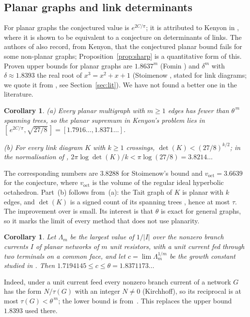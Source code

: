 \documentclass[11pt]{amsart}
\theoremstyle{plain}
\newtheorem{corollary}[theorem]{Corollary}
\theoremstyle{remark}
\newcommand{\tht}{\theta}
\begin{document}
\subsection*{Planar graphs and link determinants}
For planar graphs the conjectured value is $e^{2C/\pi}$; it is attributed to Kenyon in
\cite[Conjecture~2.3]{CKP}, where it is shown to be equivalent to a conjecture on determinants of links. The
authors of \cite{CKP} also record, from Kenyon, that the conjectured planar bound fails for some non-planar
graphs; Proposition~\ref{prop:sharp} is a quantitative form of this. Proven upper bounds for planar graphs are
$1.8637^m$ (Fomin \cite{Fomin}) and $\delta^m$ with $\delta\approx1.8393$ the real root of $x^3=x^2+x+1$
(Stoimenow \cite{Stoimenow}, stated for link diagrams; we quote it from \cite{CKP,GJKLZ}, see
Section~\ref{sec:lit}). We have not found a better one in the literature.

\begin{corollary}\label{cor:planar}
\textup{(a)} Every planar multigraph with $m\ge1$ edges has fewer than $\tht^{\,m}$ spanning trees, so the planar
supremum in Kenyon's problem lies in $[\,e^{2C/\pi},\sqrt{27/8}\,]=[1.7916\ldots,1.8371\ldots]$.

\textup{(b)} For every link diagram $K$ with $k\ge1$ crossings, $\det(K)<(27/8)^{k/2}$; in the normalisation of
\cite{CKP}, $2\pi\log\det(K)/k<\pi\log(27/8)=3.8214\ldots$
\end{corollary}
\noindent The corresponding numbers are $3.8288$ for Stoimenow's bound and $v_{\mathrm{oct}}=3.6639$ for the
conjecture, where $v_{\mathrm{oct}}$ is the volume of the regular ideal hyperbolic octahedron. Part~(b) follows
from~(a): the Tait graph of $K$ is planar with $k$ edges, and $\det(K)$ is a signed count of its spanning trees
\cite[Lemma~2.1]{CKP}, hence at most $\tau$. The improvement over \cite{Stoimenow} is
small. Its interest is that $\tht$ is exact for general graphs, so it marks the limit of every method that does
not use planarity.

\begin{corollary}\label{cor:current}
Let $\Lambda_m$ be the largest value of $1/|I|$ over the nonzero branch currents $I$ of planar networks of $m$ unit
resistors, with a unit current fed through two terminals on a common face, and let $c=\lim\Lambda_m^{1/m}$ be the
growth constant studied in \cite{M2}. Then $1.7194145\le c\le\tht=1.8371173\ldots$
\end{corollary}
\noindent Indeed, under a unit current feed every nonzero branch current of a network $G$ has the form $N/\tau(G)$
with an integer $N\ne0$ (Kirchhoff), so its reciprocal is at most $\tau(G)<\tht^{\,m}$; the lower bound is
from~\cite{M2}. This replaces the upper bound $1.8393$ used there.
\end{document}
